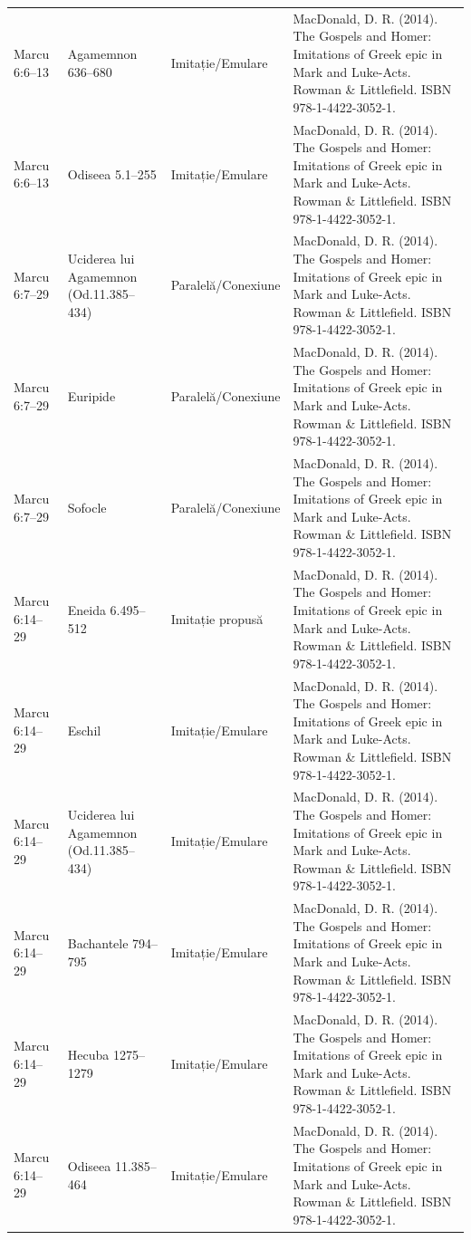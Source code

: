 \documentclass[12pt,a4paper,twoside,openany]{book}
\begin{document}
\begin{longtable}{L{1.4cm}L{1.7cm}L{3.1cm}L{8.4cm}}
Marcu 6:6–13 & Agamemnon 636–680 & Imitație/Emulare & MacDonald, D. R. (2014). The Gospels and Homer: Imitations of Greek epic in Mark and Luke-Acts. Rowman \& Littlefield. ISBN 978-1-4422-3052-1. \\
Marcu 6:6–13 & Odiseea 5.1–255 & Imitație/Emulare & MacDonald, D. R. (2014). The Gospels and Homer: Imitations of Greek epic in Mark and Luke-Acts. Rowman \& Littlefield. ISBN 978-1-4422-3052-1. \\
Marcu 6:7–29 & Uciderea lui Agamemnon (Od.11.385–434) & Paralelă/Conexiune & MacDonald, D. R. (2014). The Gospels and Homer: Imitations of Greek epic in Mark and Luke-Acts. Rowman \& Littlefield. ISBN 978-1-4422-3052-1. \\
Marcu 6:7–29 & Euripide & Paralelă/Conexiune & MacDonald, D. R. (2014). The Gospels and Homer: Imitations of Greek epic in Mark and Luke-Acts. Rowman \& Littlefield. ISBN 978-1-4422-3052-1. \\
Marcu 6:7–29 & Sofocle & Paralelă/Conexiune & MacDonald, D. R. (2014). The Gospels and Homer: Imitations of Greek epic in Mark and Luke-Acts. Rowman \& Littlefield. ISBN 978-1-4422-3052-1. \\
Marcu 6:14–29 & Eneida 6.495–512 & Imitație propusă & MacDonald, D. R. (2014). The Gospels and Homer: Imitations of Greek epic in Mark and Luke-Acts. Rowman \& Littlefield. ISBN 978-1-4422-3052-1. \\
Marcu 6:14–29 & Eschil & Imitație/Emulare & MacDonald, D. R. (2014). The Gospels and Homer: Imitations of Greek epic in Mark and Luke-Acts. Rowman \& Littlefield. ISBN 978-1-4422-3052-1. \\
Marcu 6:14–29 & Uciderea lui Agamemnon (Od.11.385–434) & Imitație/Emulare & MacDonald, D. R. (2014). The Gospels and Homer: Imitations of Greek epic in Mark and Luke-Acts. Rowman \& Littlefield. ISBN 978-1-4422-3052-1. \\
Marcu 6:14–29 & Bachantele 794–795 & Imitație/Emulare & MacDonald, D. R. (2014). The Gospels and Homer: Imitations of Greek epic in Mark and Luke-Acts. Rowman \& Littlefield. ISBN 978-1-4422-3052-1. \\
Marcu 6:14–29 & Hecuba 1275–1279 & Imitație/Emulare & MacDonald, D. R. (2014). The Gospels and Homer: Imitations of Greek epic in Mark and Luke-Acts. Rowman \& Littlefield. ISBN 978-1-4422-3052-1. \\
Marcu 6:14–29 & Odiseea 11.385–464 & Imitație/Emulare & MacDonald, D. R. (2014). The Gospels and Homer: Imitations of Greek epic in Mark and Luke-Acts. Rowman \& Littlefield. ISBN 978-1-4422-3052-1. \\

\end{longtable}
\end{document}
